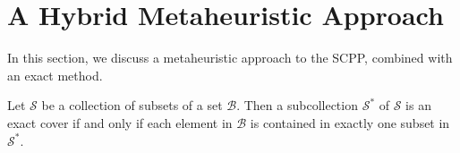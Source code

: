 \documentclass[authoryear]{elsarticle}
\begin{document}
\begin{comment}
{\color{myRed}
\begin{itemize}[leftmargin=*]
	\item Better than heuristics - compare.
	\item Artificial
	\begin{itemize}
		\item AGX$'$ best for $W=2500$, GGA best for $W=5000$ -- what does this show?
		\item NSA105, no recombination operator produced a single solution where $|\mathcal{S}| = t$.
		\item As $n$ increases, difference between $t$ and average $|\mathcal{S}|$ increases, i.e. for NSA12, difference is between 0.045 -- 0.026, whereas for NSA105, difference is between 13.157 -- 12.708.
		\item Number of solutions where $|\mathcal{S}| = t$ decreases as $n$ increases.
		\item Number of solutions where $|\mathcal{S}| = t$ less when $W=5000$ than when $W=2500$ for same number of items $n$.
		\item Difference between average $|\mathcal{S}|$ and $t$ smaller when $W=2500$ than when $W=5000$ for same number of items $n$.
	\end{itemize}
	\item Real
	\begin{itemize}
		\item GGA better when $W=5000$.
	\end{itemize}	
	\item Time graph output.
	\item Number of EA iterations within time limit, how does it vary between recombination operators?
\end{itemize}
}
\end{comment}

\section{A Hybrid Metaheuristic Approach}
\label{sec:cmsa}
\noindent In this section, we discuss a metaheuristic approach to the SCPP, combined with an exact method.

\begin{definition}
	\label{defn:exactcover}
	Let $\mathcal{S}$ be a collection of subsets of a set $\mathcal{B}$. Then a subcollection $\mathcal{S}^*$ of $\mathcal{S}$ is an exact cover if and only if each element in $\mathcal{B}$ is contained in exactly one subset in $\mathcal{S}^*$.
\end{definition}	
\end{document}
